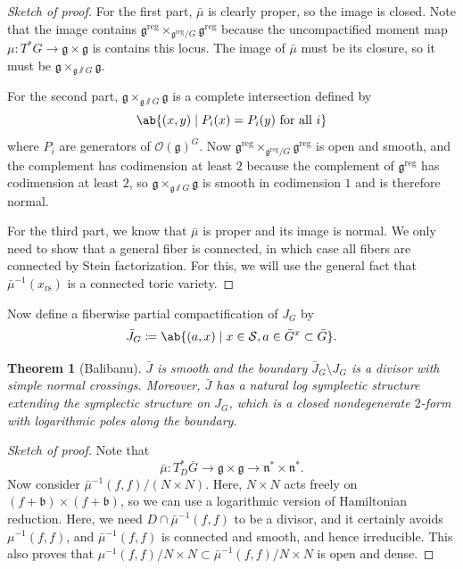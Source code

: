 \documentclass{amsart}
\newtheorem{thm}{Theorem}[section]
\theoremstyle{definition}
\theoremstyle{remark}
\theoremstyle{plain}
\theoremstyle{definition}
\theoremstyle{remark}
\newcommand{\g}{\mathfrak{g}}
\newcommand{\n}{\mathfrak{n}}
\renewcommand{\b}{\mathfrak{b}}
\newcommand{\mc}[1]{\mathcal{#1}}
\newcommand{\on}[1]{\operatorname{#1}}
\newcommand{\1}{\mathbf{1}}
\newcommand{\2}{\mathbf{2}}
\newcommand{\3}{\mathbf{3}}
\begin{document}
\begin{proof}[Sketch of proof]
    For the first part, \(\bar{\mu}\) is clearly proper, so the image is closed. Note that the image contains \(\g^{\on{reg}} \times_{\g^{\on{reg}} / G} \g^{\on{reg}}\) because the uncompactified moment map \(\mu \colon T^* G \to \g \times \g\) is contains this locus. The image of \(\bar{\mu}\) must be its closure, so it must be \(\g \times_{\g \sslash G} \g\).

    For the second part, \(\g \times_{\g \sslash G} \g\) is a complete intersection defined by
    \[ \ab\{(x,y) \mid P_i(x) = P_i(y) \text{ for all } i\} \]
    where \(P_i\) are generators of \(\mc{O}(\g)^G\). Now \(\g^{\on{reg}} \times_{\g^{\on{reg}}/G} \g^{\on{reg}}\) is open and smooth, and the complement has codimension at least \(2\) because the complement of \(\g^{\on{reg}}\) has codimension at least \(2\), so \(\g \times_{\g \sslash G} \g\) is smooth in codimension \(1\) and is therefore normal.

    For the third part, we know that \(\bar{\mu}\) is proper and its image is normal. We only need to show that a general fiber is connected, in which case all fibers are connected by Stein factorization. For this, we will use the general fact that \(\bar{\mu}^{-1}(x_{\on{rs}})\) is a connected toric variety.
\end{proof}

Now define a fiberwise partial compactification of \(J_G\) by
\[ \bar{J}_G \coloneqq \ab\{ (a,x) \mid x \in \mc{S}, a \in \bar{G}^x \subset \bar{G}\}. \]

\begin{thm}[Balibanu]
    \(\bar{J}\) is smooth and the boundary \(\bar{J}_G \setminus J_G\) is a divisor with simple normal crossings. Moreover, \(\bar{J}\) has a natural log symplectic structure extending the symplectic structure on \(J_G\), which is a closed nondegenerate \(2\)-form with logarithmic poles along the boundary.
\end{thm}

\begin{proof}[Sketch of proof]
    Note that
    \[ \bar{\mu} \colon T_D^* \bar{G} \to \g \times \g \to \n^* \times \n^*. \]
    Now consider \(\bar{\mu}^{-1}(f,f) / (N \times N)\). Here, \(N \times N\) acts freely on \((f+\b) \times (f + \b)\), so we can use a logarithmic version of Hamiltonian reduction. Here, we need \(D \cap \bar{\mu}^{-1}(f,f)\) to be a divisor, and it certainly avoids \(\mu^{-1}(f,f)\), and \(\bar{\mu}^{-1}(f,f)\) is connected and smooth, and hence irreducible. This also proves that \(\mu^{-1}(f,f)/N \times N \subset \bar{\mu}^{-1}(f,f)/N \times N\) is open and dense.
\end{proof}
\end{document}
